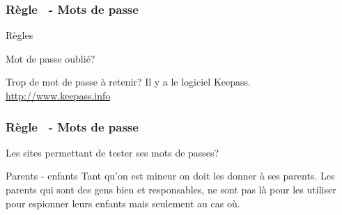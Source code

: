 \documentclass{beamer}
\newcounter{moncompteur}
\begin{document}
\begin{frame}

\frametitle{Règle \themoncompteur \  - Mots de passe}
\begin{block}{Règles}
\begin{itemize}
\end{itemize}
\end{block}

\begin{block}{Mot de passe oublié?}
\end{block}

\begin{block}{Trop de mot de passe à retenir?}
Il y a le logiciel Keepass. \url{http://www.keepass.info}
\end{block}

\end{frame}

\begin{frame}

\frametitle{Règle \themoncompteur \  - Mots de passe}
\begin{block}{Les sites permettant de tester ses mots de passes?}
\begin{itemize}
\end{itemize}
\end{block}

\begin{block}{Parents - enfants}
Tant qu’on est mineur on doit les donner à ses parents. Les parents qui sont des gens bien et responsables, ne sont pas là pour les utiliser pour espionner leurs enfants mais seulement au cas où.
\end{block}

\end{frame}
\addtocounter{moncompteur}{1}
\end{document}
